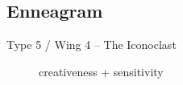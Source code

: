 \documentclass[10pt, a4paper, twocolumn]{article}
\begin{document}
 \subsection*{Enneagram}
 \begin{description}

 \item[Type 5 / Wing 4 -- The Iconoclast] %
 \item[] creativeness + sensitivity
 \end{description}

\end{document}
